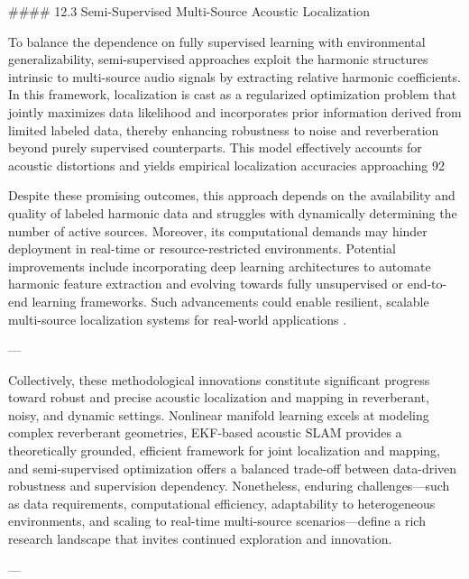 \documentclass[11pt]{article}
\begin{document}
#### 12.3 Semi-Supervised Multi-Source Acoustic Localization

To balance the dependence on fully supervised learning with environmental generalizability, semi-supervised approaches exploit the harmonic structures intrinsic to multi-source audio signals by extracting relative harmonic coefficients. In this framework, localization is cast as a regularized optimization problem that jointly maximizes data likelihood and incorporates prior information derived from limited labeled data, thereby enhancing robustness to noise and reverberation beyond purely supervised counterparts. This model effectively accounts for acoustic distortions and yields empirical localization accuracies approaching 92%

Despite these promising outcomes, this approach depends on the availability and quality of labeled harmonic data and struggles with dynamically determining the number of active sources. Moreover, its computational demands may hinder deployment in real-time or resource-restricted environments. Potential improvements include incorporating deep learning architectures to automate harmonic feature extraction and evolving towards fully unsupervised or end-to-end learning frameworks. Such advancements could enable resilient, scalable multi-source localization systems for real-world applications \cite{ref52}.

---

Collectively, these methodological innovations constitute significant progress toward robust and precise acoustic localization and mapping in reverberant, noisy, and dynamic settings. Nonlinear manifold learning excels at modeling complex reverberant geometries, EKF-based acoustic SLAM provides a theoretically grounded, efficient framework for joint localization and mapping, and semi-supervised optimization offers a balanced trade-off between data-driven robustness and supervision dependency. Nonetheless, enduring challenges—such as data requirements, computational efficiency, adaptability to heterogeneous environments, and scaling to real-time multi-source scenarios—define a rich research landscape that invites continued exploration and innovation.

---




\end{document}
